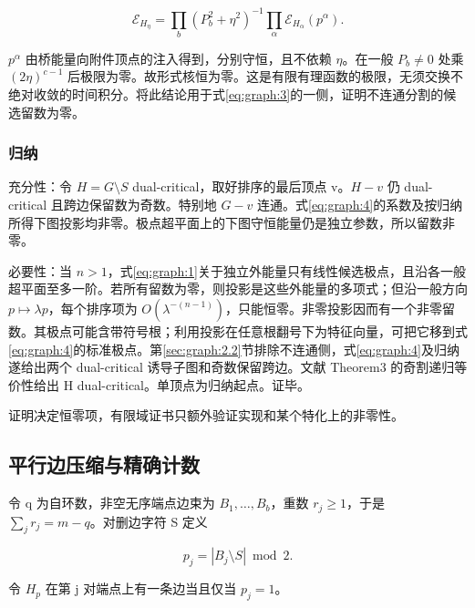 \documentclass[11pt,a4paper,oneside]{ctexart}
\theoremstyle{cnplain}
\theoremstyle{definition}
\theoremstyle{remark}
\numberwithin{equation}{section}
\begin{document}
\begin{equation}
\mathscr E_{H_\eta}
 =\prod_b(P_b^2+\eta^2)^{-1}
   \prod_\alpha\mathscr E_{H_\alpha}(p^\alpha).
\end{equation}

\(p^\alpha\) 由桥能量向附件顶点的注入得到，分别守恒，且不依赖 \(\eta\)。在一般 \(P_b\ne0\) 处乘 \((2\eta)^{c-1}\) 后极限为零。故形式核恒为零。这是有限有理函数的极限，无须交换不绝对收敛的时间积分。将此结论用于式\eqref{eq:graph:3}的一侧，证明不连通分割的候选留数为零。

\subsubsection{归纳}\label{sec:graph:2.3}

充分性：令 \(H=G\setminus S\) dual-critical，取好排序的最后顶点 v。\(H-v\) 仍 dual-critical 且跨边保留数为奇数。特别地 \(G-v\) 连通。式\eqref{eq:graph:4}的系数及按归纳所得下图投影均非零。极点超平面上的下图守恒能量仍是独立参数，所以留数非零。

必要性：当 \(n>1\)，式\eqref{eq:graph:1}关于独立外能量只有线性候选极点，且沿各一般超平面至多一阶。若所有留数为零，则投影是这些外能量的多项式；但沿一般方向 \(p\mapsto\lambda p\)，每个排序项为 \(O(\lambda^{-(n-1)})\)，只能恒零。非零投影因而有一个非零留数。其极点可能含带符号根；利用投影在任意根翻号下为特征向量，可把它移到式\eqref{eq:graph:4}的标准极点。第\ref{sec:graph:2.2}节排除不连通侧，式\eqref{eq:graph:4}及归纳遂给出两个 dual-critical 诱导子图和奇数保留跨边。文献\cite{dualcritical} Theorem3 的奇割递归等价性给出 H dual-critical。单顶点为归纳起点。证毕。

证明决定恒零项，有限域证书只额外验证实现和某个特化上的非零性。


\subsection{平行边压缩与精确计数}\label{sec:graph:3}

令 q 为自环数，非空无序端点边束为 \(B_1,\ldots,B_b\)，重数 \(r_j\ge1\)，于是 \(\sum_jr_j=m-q\)。对删边字符 S 定义

\begin{equation}
p_j=|B_j\setminus S|\bmod2.
\end{equation}

令 \(H_p\) 在第 j 对端点上有一条边当且仅当 \(p_j=1\)。
\end{document}
